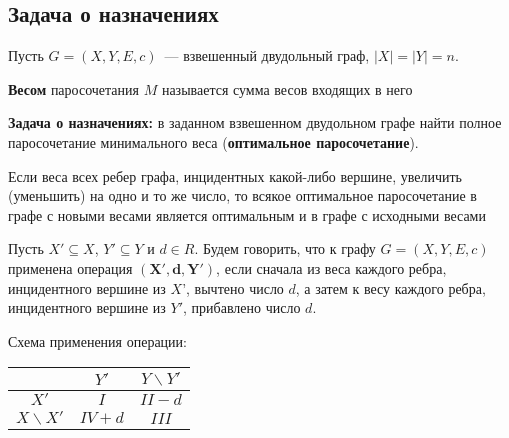 \subsection{Задача о назначениях}

Пусть $G=(X,Y,E,c)$~--- взвешенный двудольный граф, \linebreak $|X|=|Y|=n$.

\textbf{Весом} паросочетания $M$ называется сумма весов входящих в него 

\textbf{Задача о назначениях:} в заданном взвешенном двудольном графе найти полное паросочетание минимального веса (\textbf{оптимальное паросочетание}).

Если веса всех ребер графа, инцидентных какой-либо вершине, увеличить (уменьшить) на одно и то же число, то всякое оптимальное паросочетание в графе с новыми весами является оптимальным и в графе с исходными весами

Пусть $X' \subseteq X$, $Y'\subseteq Y$ и $d\in R$. Будем говорить, что к графу $G=(X,Y,E,c)$ применена операция $\mathbf{(X',d,Y')}$, если сначала из веса каждого ребра, инцидентного вершине из $X’$, вычтено число $d$, а затем к весу каждого ребра, инцидентного вершине из $Y'$, прибавлено число $d$.

Схема применения операции:

\begin{center}
\begin{tabular}{|c||c|c|}
\hline
&$Y'$&$Y\backslash Y'$\\
\hline\hline
$X'$&$I$&$II-d$\\
\hline
$X\backslash X'$&$IV+d$&$III$\\
\hline
\end{tabular}
\end{center}

